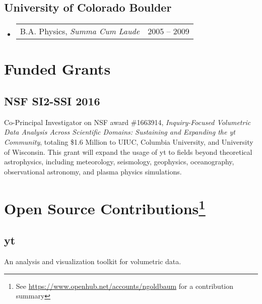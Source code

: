 \documentclass[10pt,letterpaper]{article}
\newcommand{\textline}[2]{
  \begin{tabularx}{\textwidth}{XY}
  #1 & #2
  \end{tabularx}
}
\begin{document}
\subsection*{University of Colorado Boulder}
\begin{itemize}
  \item[] \textline{B.A. Physics, \textit{Summa Cum Laude}}{2005 -- 2009}
\end{itemize}

\section*{Funded Grants}

\subsection*{NSF SI2-SSI 2016}
Co-Principal Investigator on NSF award \#1663914, \textit{Inquiry-Focused
  Volumetric Data Analysis Across Scientific Domains: Sustaining and Expanding
  the yt Community}, totaling \$1.6 Million to UIUC, Columbia University, and
University of Wisconsin. This grant will expand the usage of yt to fields
beyond theoretical astrophysics, including meteorology, seismology, geophysics,
oceanography, observational astronomy, and plasma physics simulations.

\section*{Open Source Contributions\footnote{See
    \href{https://www.openhub.net/accounts/ngoldbaum}{https://www.openhub.net/accounts/ngoldbaum}
    for a contribution summary}}

\subsection*{yt}
An analysis and visualization toolkit for volumetric data.
\end{document}
